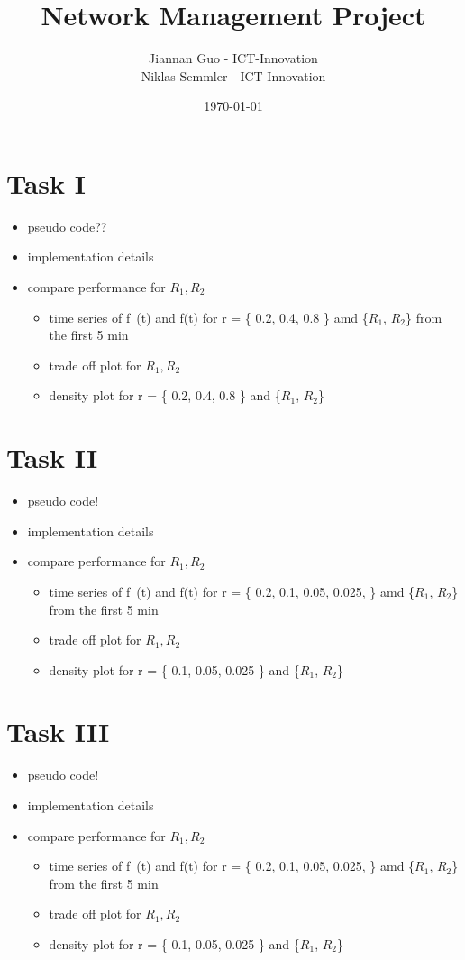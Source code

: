 \documentclass[a4paper, smallheadings,english]{scrartcl}
\newcommand{\Author}{Jiannan Guo - ICT-Innovation\\Niklas Semmler - ICT-Innovation}
\newcommand{\Title}{Network Management Project}
\begin{document}
\title{\Title}
\author{\Author}
\date{\today}
\maketitle
\thispagestyle{firststyle}
\section{Task I}
\begin{itemize}
    \item pseudo code??
    \item implementation details
    \item compare performance for $R_1, R_2$
    \begin{itemize}
        \item time series of f~(t) and f(t) for r = \{ 0.2, 0.4, 0.8 \} amd \{$R_1$, $R_2$\} from the first 5 min
        \item trade off plot for $R_1, R_2$
        \item density plot for r = \{ 0.2, 0.4, 0.8 \} and \{$R_1$, $R_2$\}
    \end{itemize}
\end{itemize}

\section{Task II}
\begin{itemize}
    \item pseudo code!
    \item implementation details
    \item compare performance for $R_1, R_2$
    \begin{itemize}
        \item time series of f~(t) and f(t) for r = \{ 0.2, 0.1, 0.05, 0.025, \} amd \{$R_1$, $R_2$\} from the first 5 min
        \item trade off plot for $R_1, R_2$
        \item density plot for r = \{ 0.1, 0.05, 0.025 \} and \{$R_1$, $R_2$\}
    \end{itemize}
\end{itemize}

\section{Task III}
\begin{itemize}
    \item pseudo code!
    \item implementation details
    \item compare performance for $R_1, R_2$
    \begin{itemize}
        \item time series of f~(t) and f(t) for r = \{ 0.2, 0.1, 0.05, 0.025, \} amd \{$R_1$, $R_2$\} from the first 5 min
        \item trade off plot for $R_1, R_2$
        \item density plot for r = \{ 0.1, 0.05, 0.025 \} and \{$R_1$, $R_2$\}
    \end{itemize}
\end{itemize}
\end{document}
